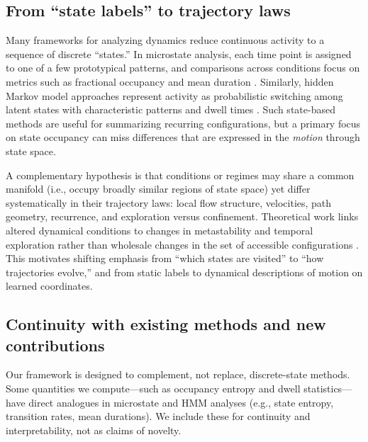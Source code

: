 \documentclass[5p,twocolumn,authoryear]{elsarticle}
\begin{document}
\subsection{From ``state labels'' to trajectory laws}

Many frameworks for analyzing dynamics reduce continuous activity to a sequence of discrete ``states.'' In microstate analysis, each time point is assigned to one of a few prototypical patterns, and comparisons across conditions focus on metrics such as fractional occupancy and mean duration \citep{Michel2018}. Similarly, hidden Markov model approaches represent activity as probabilistic switching among latent states with characteristic patterns and dwell times \citep{Baker2014,Vidaurre2018}. Such state-based methods are useful for summarizing recurring configurations, but a primary focus on state occupancy can miss differences that are expressed in the \emph{motion} through state space.

A complementary hypothesis is that conditions or regimes may share a common manifold (i.e., occupy broadly similar regions of state space) yet differ systematically in their trajectory laws: local flow structure, velocities, path geometry, recurrence, and exploration versus confinement. Theoretical work links altered dynamical conditions to changes in metastability and temporal exploration rather than wholesale changes in the set of accessible configurations \citep{Cavanna2018,Deco2017}. This motivates shifting emphasis from ``which states are visited'' to ``how trajectories evolve,'' and from static labels to dynamical descriptions of motion on learned coordinates.

\subsection{Continuity with existing methods and new contributions}

Our framework is designed to complement, not replace, discrete-state methods. Some quantities we compute---such as occupancy entropy and dwell statistics---have direct analogues in microstate and HMM analyses (e.g., state entropy, transition rates, mean durations). We include these for continuity and interpretability, not as claims of novelty.
\end{document}
